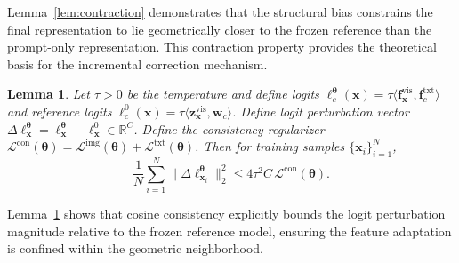 \documentclass{article}
\theoremstyle{plain}
\newtheorem{lemma}[theorem]{Lemma}
\theoremstyle{definition}
\theoremstyle{remark}
\begin{document}
	Lemma~\ref{lem:contraction} demonstrates that the structural bias constrains the final representation to lie geometrically closer to the frozen reference than the prompt-only representation. This contraction property provides the theoretical basis for the incremental correction mechanism.
	\begin{lemma}\label{lem:logit_perturb}
		Let $\tau>0$ be the temperature and define logits $\ell^{\boldsymbol{\theta}}_c(\mathbf{x})=\tau\bigl\langle \mathbf{f}^{\mathrm{vis}}_{\mathbf{x}},\mathbf{f}^{\mathrm{txt}}_{c}\bigr\rangle$ and reference logits $\ell^{0}_c(\mathbf{x})=\tau\bigl\langle \mathbf{z}^{\mathrm{vis}}_{\mathbf{x}},\mathbf{w}_{c}\bigr\rangle$. Define logit perturbation vector $\Delta\boldsymbol{\ell}^{\boldsymbol{\theta}}_{\mathbf{x}}=\boldsymbol{\ell}^{\boldsymbol{\theta}}_{\mathbf{x}}-\boldsymbol{\ell}^{0}_{\mathbf{x}}\in\mathbb R^{C}$. Define the consistency regularizer $\mathcal L^{\mathrm{con}}(\boldsymbol{\theta})=\mathcal L^{\mathrm{img}}(\boldsymbol{\theta})+\mathcal L^{\mathrm{txt}}(\boldsymbol{\theta})$.
		Then for training samples $\{\mathbf{x}_i\}_{i=1}^N$,
		\begin{equation*}
			\frac1N\sum_{i=1}^N\|\Delta\boldsymbol{\ell}^{\boldsymbol{\theta}}_{\mathbf{x}_i}\|_2^2
			\le
			4\tau^2 C\,\mathcal L^{\mathrm{con}}(\boldsymbol{\theta}).
		\end{equation*}
	\end{lemma}
	Lemma~\ref{lem:logit_perturb} shows that cosine consistency explicitly bounds the logit perturbation magnitude relative to the frozen reference model, ensuring the feature adaptation is confined within the geometric neighborhood.
\end{document}
